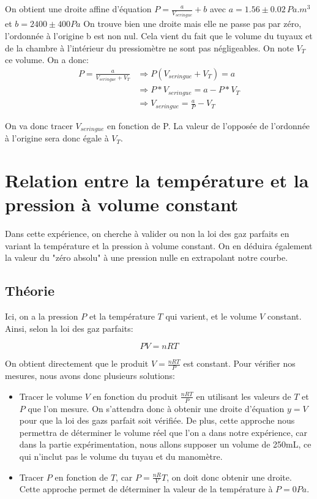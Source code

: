\documentclass[12pt]{article}
\begin{document}
On obtient une droite affine d'équation $P=\frac{a}{V_{seringue}}+b$ avec $a=1.56\pm 0.02\, Pa.m^3$ et $b=2400\pm 400 Pa$
On trouve bien une droite mais elle ne passe pas par zéro, l'ordonnée à l'origine b est non nul. Cela vient du fait que le volume du tuyaux et de la chambre à l'intérieur du pressiomètre ne sont pas négligeables. On note $V_T$ ce volume. On a donc:
\begin{align*}
P=\frac{a}{V_{seringue}+V_T}&\Rightarrow P(V_{seringue}+V_T)=a \\
	&\Rightarrow P*V_{seringue}=a-P*V_T \\
	&\Rightarrow V_{seringue}=\frac{a}{P}-V_T
\end{align*}

On va donc tracer $V_{seringue}$ en fonction de P. La valeur de l'opposée de l'ordonnée à l'origine sera donc égale à $V_T$. 

\newpage
\section{Relation entre la température et la pression à volume constant}
Dans cette expérience, on cherche à valider ou non la loi des gaz parfaits en variant la température et la pression
à volume constant. On en déduira également la valeur du "zéro absolu" à une pression nulle en extrapolant notre courbe.

\subsection{Théorie}
Ici, on a la pression $P$ et la température $T$ qui varient, et le volume $V$ constant. Ainsi, selon la loi des gaz parfaits:

\begin{equation}
    PV = nRT
\end{equation}

On obtient directement que le produit $V = \frac{nRT}{P}$ est constant. Pour vérifier nos mesures, nous avons donc plusieurs solutions:
\begin{itemize}
    \item Tracer le volume $V$ en fonction du produit $\frac{nRT}{P}$ en utilisant les valeurs de $T$ et $P$ que l'on mesure.
    On s'attendra donc à obtenir une droite d'équation $y = V$ pour que la loi des gazs parfait soit vérifiée. De plus, cette approche nous permettra de déterminer le volume réel
    que l'on a dans notre expérience, car dans la partie expérimentation, nous allons supposer un volume de 250mL, ce qui n'inclut pas le volume du tuyau et du manomètre.
    \item Tracer $P$ en fonction de $T$, car $P = \frac{nR}{V} T$, on doit donc obtenir une droite. Cette approche permet de déterminer la valeur de la température à $P=0Pa$.
\end{itemize}
\end{document}
